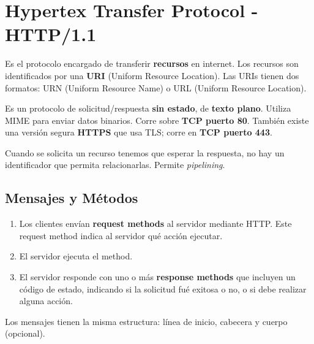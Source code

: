 \section{Hypertex Transfer Protocol - HTTP/1.1}

Es el protocolo encargado de transferir \textbf{recursos} en internet. Los recursos son identificados por una \textbf{URI} (Uniform Resource Location). Las URIs tienen dos formatos: URN (Uniform Resource Name) o URL (Uniform Resource Location).

\begin{tcolorbox}[
    enhanced,
    colback=blue!3!white,         %
    colframe=blue!60!black,       %
    title=\textbf{Funcionamiento de HTTP},
    fonttitle=\large\sffamily,    %
    coltitle=white,
    boxrule=1.2pt,
    arc=6pt,                      %
    drop shadow=black!15!white,   %
    left=10pt, right=10pt, top=10pt, bottom=10pt
]
Es un protocolo de solicitud/respuesta \textbf{sin estado}, de \textbf{texto plano}. Utiliza MIME para enviar datos binarios. Corre sobre \textbf{TCP puerto 80}. También existe una versión segura \textbf{HTTPS} que usa TLS; corre en \textbf{TCP puerto 443}. 

Cuando se solicita un recurso tenemos que esperar la respuesta, no hay un identificador que permita relacionarlas. Permite \emph{pipelining}.
\end{tcolorbox}

\subsection{Mensajes y Métodos}

\begin{enumerate}[label=\textcolor{acento}{\textbf{\arabic*.}}]
    \item Los clientes envían \textbf{request methods} al servidor mediante HTTP. Este request method indica al servidor qué acción ejecutar.
    \item El servidor ejecuta el method.
    \item El servidor responde con uno o más \textbf{response methods} que incluyen un código de estado, indicando si la solicitud fué exitosa o no, o si debe realizar alguna acción.
\end{enumerate}

Los mensajes tienen la misma estructura: línea de inicio, cabecera y cuerpo (opcional). 

